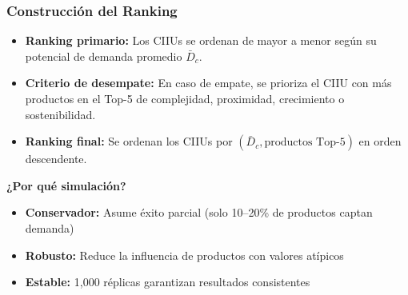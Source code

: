 \documentclass[aspectratio=169,xcolor=dvipsnames]{beamer}
\begin{document}
\begin{frame}
\frametitle{Construcción del Ranking}

\begin{itemize}
    \item \textbf{Ranking primario:} Los CIIUs se ordenan de mayor a menor según su potencial de demanda promedio $\bar{D}_c$.
    
    \item \textbf{Criterio de desempate:} En caso de empate, se prioriza el CIIU con más productos en el Top-5 de complejidad, proximidad, crecimiento o sostenibilidad.
    
    \item \textbf{Ranking final:} Se ordenan los CIIUs por $(\bar{D}_c, \text{productos Top-5})$ en orden descendente.
\end{itemize}

\textbf{¿Por qué simulación?}
\begin{itemize}
    \item \textbf{Conservador:} Asume éxito parcial (solo 10--20\% de productos captan demanda)
    \item \textbf{Robusto:} Reduce la influencia de productos con valores atípicos
    \item \textbf{Estable:} 1,000 réplicas garantizan resultados consistentes
\end{itemize}

\end{frame}
\end{document}
